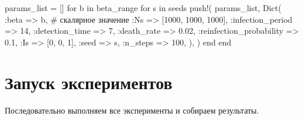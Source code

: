 \documentclass[
  12pt,
  a4paper,
  DIV=11,
  numbers=noendperiod]{scrreprt}
\newenvironment{Shaded}{\begin{snugshade}}{\end{snugshade}}
\newcommand{\CommentTok}[1]{\textcolor[rgb]{0.37,0.37,0.37}{#1}}
\newcommand{\ControlFlowTok}[1]{\textcolor[rgb]{0.00,0.23,0.31}{#1}}
\newcommand{\FloatTok}[1]{\textcolor[rgb]{0.68,0.00,0.00}{#1}}
\newcommand{\FunctionTok}[1]{\textcolor[rgb]{0.28,0.35,0.67}{#1}}
\newcommand{\KeywordTok}[1]{\textcolor[rgb]{0.00,0.23,0.31}{#1}}
\newcommand{\NormalTok}[1]{\textcolor[rgb]{0.00,0.23,0.31}{#1}}
\newcommand{\OperatorTok}[1]{\textcolor[rgb]{0.37,0.37,0.37}{#1}}
\newcommand{\SpecialCharTok}[1]{\textcolor[rgb]{0.37,0.37,0.37}{#1}}
\newcommand{\StringTok}[1]{\textcolor[rgb]{0.13,0.47,0.30}{#1}}
\begin{document}
\begin{Shaded}
\begin{Highlighting}[]
\NormalTok{params\_list }\OperatorTok{=}\NormalTok{ []}
\ControlFlowTok{for}\NormalTok{ b }\KeywordTok{in}\NormalTok{ beta\_range}
    \ControlFlowTok{for}\NormalTok{ s }\KeywordTok{in}\NormalTok{ seeds}
        \FunctionTok{push!}\NormalTok{(}
\NormalTok{            params\_list,}
            \FunctionTok{Dict}\NormalTok{(}
                \OperatorTok{:}\NormalTok{beta }\OperatorTok{=\textgreater{}}\NormalTok{ b,               }\CommentTok{\# скалярное значение}
                \OperatorTok{:}\NormalTok{Ns }\OperatorTok{=\textgreater{}}\NormalTok{ [}\FloatTok{1000}\NormalTok{, }\FloatTok{1000}\NormalTok{, }\FloatTok{1000}\NormalTok{],}
                \OperatorTok{:}\NormalTok{infection\_period }\OperatorTok{=\textgreater{}} \FloatTok{14}\NormalTok{,}
                \OperatorTok{:}\NormalTok{detection\_time }\OperatorTok{=\textgreater{}} \FloatTok{7}\NormalTok{,}
                \OperatorTok{:}\NormalTok{death\_rate }\OperatorTok{=\textgreater{}} \FloatTok{0.02}\NormalTok{,}
                \OperatorTok{:}\NormalTok{reinfection\_probability }\OperatorTok{=\textgreater{}} \FloatTok{0.1}\NormalTok{,}
                \OperatorTok{:}\NormalTok{Is }\OperatorTok{=\textgreater{}}\NormalTok{ [}\FloatTok{0}\NormalTok{, }\FloatTok{0}\NormalTok{, }\FloatTok{1}\NormalTok{],}
                \OperatorTok{:}\NormalTok{seed }\OperatorTok{=\textgreater{}}\NormalTok{ s,}
                \OperatorTok{:}\NormalTok{n\_steps }\OperatorTok{=\textgreater{}} \FloatTok{100}\NormalTok{,}
\NormalTok{            ),}
\NormalTok{        )}
    \ControlFlowTok{end}
\ControlFlowTok{end}
\end{Highlighting}
\end{Shaded}

\section{Запуск
экспериментов}\label{ux437ux430ux43fux443ux441ux43a-ux44dux43aux441ux43fux435ux440ux438ux43cux435ux43dux442ux43eux432}

Последовательно выполняем все эксперименты и собираем результаты.

\begin{Shaded}
\end{Shaded}
\end{document}
